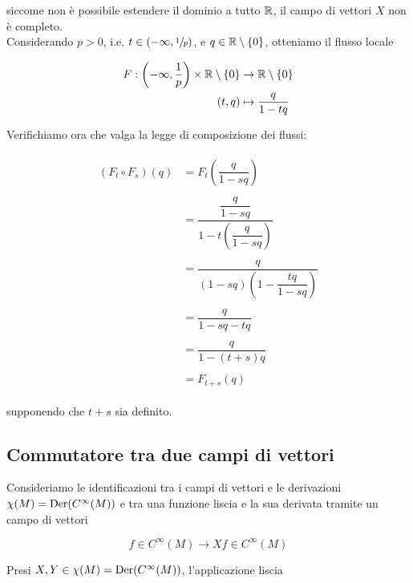 siccome non è possibile estendere il dominio a tutto $ \mathbb{R} $, il campo di vettori $ X $ non è completo.\\
Considerando $ p>0 $, i.e. $ t \in (-\infty, \sfrac{1}{p}) $, e $ q \in \mathbb{R} \setminus \{0\} $, otteniamo il flusso locale

\begin{align}
	\begin{split}
		F : \left( -\infty, \dfrac{1}{p} \right) \times \mathbb{R} \setminus \{0\} &\to \mathbb{R} \setminus \{0\}\\
		(t,q) &\mapsto \dfrac{q}{1 - t q}
	\end{split}
\end{align}

Verifichiamo ora che valga la legge di composizione dei flussi:

\begin{align}
	\begin{split}
		(F_{t} \circ F_{s})(q) &= F_{t} \left( \dfrac{q}{1 - s q} \right)\\\\
		&= \dfrac{\dfrac{q}{1 - s q}}{1 - t \left( \dfrac{q}{1 - s q} \right)}\\\\
		&= \dfrac{q}{(1 - s q) \left(1 - \dfrac{t q}{1 - s q} \right)}\\\\
		&= \dfrac{q}{1 - s q - t q}\\\\
		&= \dfrac{q}{1 - (t+s) q}\\\\
		&= F_{t+s}(q)
	\end{split}
\end{align}

supponendo che $ t+s $ sia definito.

\subsection{Commutatore tra due campi di vettori}

Consideriamo le identificazioni tra i campi di vettori e le derivazioni $ \chi(M) = \operatorname{Der}(C^{\infty}(M)) $ e tra una funzione liscia e la sua derivata tramite un campo di vettori

\begin{equation}
	f \in C^{\infty}(M) \to X f \in C^{\infty}(M)
\end{equation}

Presi $ X,Y \in \chi(M) = \operatorname{Der}(C^{\infty}(M)) $, l'applicazione liscia

